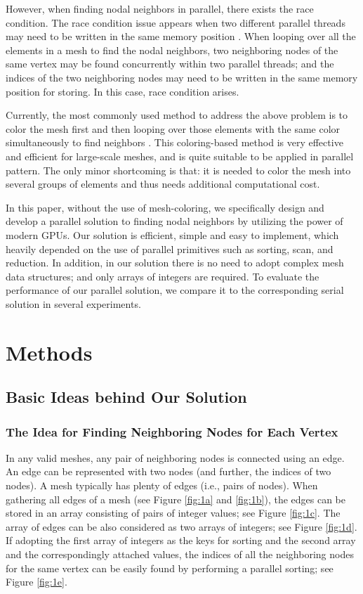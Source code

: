 \documentclass[twocolumn]{svjour3}          \smartqed  \usepackage{graphicx}
\begin{document}
However, when finding nodal neighbors in parallel, there exists the race 
condition. The race condition issue appears when two different parallel 
threads may need to be written in the same memory position \cite{06}. When looping over all the elements in a mesh to find 
the nodal neighbors, two neighboring nodes of the same vertex may be found 
concurrently within two parallel threads; and the indices of the two 
neighboring nodes may need to be written in the same memory position for 
storing. In this case, race condition arises. 

Currently, the most commonly used method to address the above problem is to 
color the mesh first and then looping over those elements with the same 
color simultaneously to find neighbors \cite{04_Chen2014,06,07,08_Benitez2014,09_Cheng2015}. This coloring-based 
method is very effective and efficient for large-scale meshes, and is quite 
suitable to be applied in parallel pattern. The only minor shortcoming is 
that: it is needed to color the mesh into several groups of elements and 
thus needs additional computational cost. 

In this paper, without the use of mesh-coloring, we specifically design and 
develop a parallel solution to finding nodal neighbors by utilizing the 
power of modern GPUs. Our solution is efficient, simple and easy to 
implement, which heavily depended on the use of parallel primitives such as 
sorting, scan, and reduction. In addition, in our solution there is no need 
to adopt complex mesh data structures; and only arrays of integers are 
required. To evaluate the performance of our parallel solution, we compare 
it to the corresponding serial solution in several experiments. 

\section{Methods}

\subsection{Basic Ideas behind Our Solution}

\subsubsection{The Idea for Finding Neighboring Nodes for Each Vertex}

In any valid meshes, any pair of neighboring nodes is connected using an 
edge. An edge can be represented with two nodes (and further, the indices of 
two nodes). A mesh typically has plenty of edges (i.e., pairs of nodes). 
When gathering all edges of a mesh (see Figure \ref{fig:1a} and \ref{fig:1b}), the edges can be stored in an array 
consisting of  pairs of integer values; see Figure \ref{fig:1c}. The array of edges 
can be also considered as two arrays of integers; see Figure \ref{fig:1d}. If 
adopting the first array of integers as the keys for sorting and the second 
array and the correspondingly attached values, the indices of all the 
neighboring nodes for the same vertex can be easily found by performing a 
parallel sorting; see Figure \ref{fig:1e}.
\end{document}
